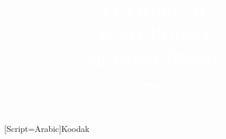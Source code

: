 

\newcommand{\confTitle}{Electronic II} %
\newcommand{\hmwkDueDate}{TonD Project} %
\newcommand{\Places}{by Bijan Binaee} %
\newcommand{\confCompany}{Summary} %


\title{
\vspace{3.5in}
\textcolor{white}{\textmd{\fontsize{40}{40}\textbf{\confTitle}}\\
\vspace{3.75in}
\small{\hmwkDueDate}\\
\large{\textit{\Places}}
}
}


\author{\textcolor{white}{\textbf{\confCompany}}}
\date{} %


\newfontfamily{\arabicfont}[Script=Arabic]{Koodak}
